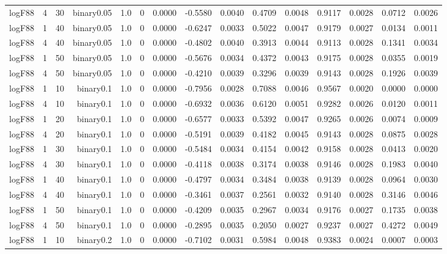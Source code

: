 \begin{longtable}{rrrrrrrrrrrrrrr}
  logF88 & 4 & 30 & binary0.05 & 1.0 & 0 & 0.0000 & -0.5580 & 0.0040 & 0.4709 & 0.0048 & 0.9117 & 0.0028 & 0.0712 & 0.0026 \\ 
  logF88 & 1 & 40 & binary0.05 & 1.0 & 0 & 0.0000 & -0.6247 & 0.0033 & 0.5022 & 0.0047 & 0.9179 & 0.0027 & 0.0134 & 0.0011 \\ 
  logF88 & 4 & 40 & binary0.05 & 1.0 & 0 & 0.0000 & -0.4802 & 0.0040 & 0.3913 & 0.0044 & 0.9113 & 0.0028 & 0.1341 & 0.0034 \\ 
  logF88 & 1 & 50 & binary0.05 & 1.0 & 0 & 0.0000 & -0.5676 & 0.0034 & 0.4372 & 0.0043 & 0.9175 & 0.0028 & 0.0355 & 0.0019 \\ 
  logF88 & 4 & 50 & binary0.05 & 1.0 & 0 & 0.0000 & -0.4210 & 0.0039 & 0.3296 & 0.0039 & 0.9143 & 0.0028 & 0.1926 & 0.0039 \\ 
  logF88 & 1 & 10 & binary0.1 & 1.0 & 0 & 0.0000 & -0.7956 & 0.0028 & 0.7088 & 0.0046 & 0.9567 & 0.0020 & 0.0000 & 0.0000 \\ 
  logF88 & 4 & 10 & binary0.1 & 1.0 & 0 & 0.0000 & -0.6932 & 0.0036 & 0.6120 & 0.0051 & 0.9282 & 0.0026 & 0.0120 & 0.0011 \\ 
  logF88 & 1 & 20 & binary0.1 & 1.0 & 0 & 0.0000 & -0.6577 & 0.0033 & 0.5392 & 0.0047 & 0.9265 & 0.0026 & 0.0074 & 0.0009 \\ 
  logF88 & 4 & 20 & binary0.1 & 1.0 & 0 & 0.0000 & -0.5191 & 0.0039 & 0.4182 & 0.0045 & 0.9143 & 0.0028 & 0.0875 & 0.0028 \\ 
  logF88 & 1 & 30 & binary0.1 & 1.0 & 0 & 0.0000 & -0.5484 & 0.0034 & 0.4154 & 0.0042 & 0.9158 & 0.0028 & 0.0413 & 0.0020 \\ 
  logF88 & 4 & 30 & binary0.1 & 1.0 & 0 & 0.0000 & -0.4118 & 0.0038 & 0.3174 & 0.0038 & 0.9146 & 0.0028 & 0.1983 & 0.0040 \\ 
  logF88 & 1 & 40 & binary0.1 & 1.0 & 0 & 0.0000 & -0.4797 & 0.0034 & 0.3484 & 0.0038 & 0.9139 & 0.0028 & 0.0964 & 0.0030 \\ 
  logF88 & 4 & 40 & binary0.1 & 1.0 & 0 & 0.0000 & -0.3461 & 0.0037 & 0.2561 & 0.0032 & 0.9140 & 0.0028 & 0.3146 & 0.0046 \\ 
  logF88 & 1 & 50 & binary0.1 & 1.0 & 0 & 0.0000 & -0.4209 & 0.0035 & 0.2967 & 0.0034 & 0.9176 & 0.0027 & 0.1735 & 0.0038 \\ 
  logF88 & 4 & 50 & binary0.1 & 1.0 & 0 & 0.0000 & -0.2895 & 0.0035 & 0.2050 & 0.0027 & 0.9237 & 0.0027 & 0.4272 & 0.0049 \\ 
  logF88 & 1 & 10 & binary0.2 & 1.0 & 0 & 0.0000 & -0.7102 & 0.0031 & 0.5984 & 0.0048 & 0.9383 & 0.0024 & 0.0007 & 0.0003 \\ 

\end{longtable}
